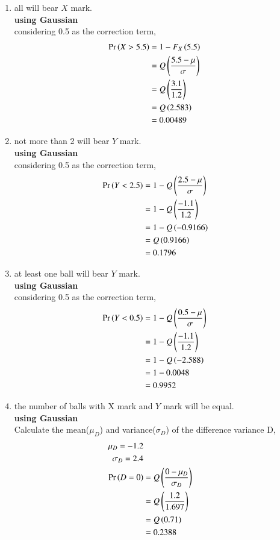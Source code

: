 \documentclass[journal,12pt,twocolumn]{IEEEtran}
\theoremstyle{remark}
\begin{document}
\begin{enumerate}[label=(\alph*)]
\item all will bear $X$ mark.\\
\textbf{using Gaussian} \\
considering 0.5 as the correction term,\\
\begin{align}
\Pr\left(X > 5.5\right) &= 1-F_X\left(5.5\right) \\
             &=Q\left(\frac{5.5-\mu}{\sigma}\right) \quad \\
             &= Q\left(\frac{3.1}{1.2}\right) \\
             &= Q\left(2.583\right) \\
             &= 0.00489
\end{align}
\item not more than 2 will bear $Y$ mark.\\  
\textbf{using Gaussian} \\
considering 0.5 as the correction term,\\
\begin{align}
\Pr\left(Y < 2.5\right) &= 1-Q\left(\frac{2.5-\mu}{\sigma}\right) \quad \\
             &= 1-Q\left(\frac{-1.1}{1.2}\right) \\
             &= 1-Q\left(-0.9166\right) \\
             &= Q\left(0.9166\right) \\
             &= 0.1796
\end{align}
\item at least one ball will bear $Y$ mark.\\
\textbf{using Gaussian} \\
considering 0.5 as the correction term,\\
\begin{align}
\Pr\left(Y < 0.5\right) &= 1-Q\left(\frac{0.5-\mu}{\sigma}\right) \quad \\
             &= 1-Q\left(\frac{-1.1}{1.2}\right) \\
             &= 1-Q\left(-2.588\right) \\
             &= 1-0.0048\\
             &= 0.9952
\end{align}
\item the number of balls with X mark and $Y$ mark will be equal.\\
\textbf{using Gaussian} \\
Calculate the mean($\mu_D$) and variance($\sigma_D$) of the difference variance D,\\
\begin{align}
\mu_D=-1.2\\
\sigma_D=2.4\\
\Pr\left(D=0\right) &= Q\left(\frac{0-\mu_D}{\sigma_D}\right) \quad \\
             &= Q\left(\frac{1.2}{1.697}\right) \\
             &= Q\left(0.71\right) \\
             &= 0.2388      
\end{align}
\end{enumerate}
\end{document}
